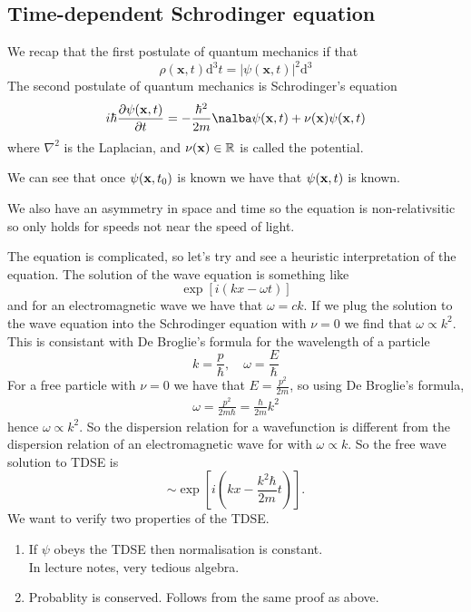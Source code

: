 \documentclass{article}
\begin{document}
\subsection{Time-dependent Schrodinger equation}
We recap that the first postulate of quantum mechanics if that 
\[
  \rho(\mathbf x,t)\mathrm d^3t=|\psi(\mathbf x,t)|^2\mathrm d^3
\]
The second postulate of quantum mechanics is Schrodinger's equation
\[
	i\hbar\frac{\partial\psi(\mathbf x,t)}{\partial t}=-\frac{\hbar^2}{2m}\nalba\psi(\mathbf x,t)+\nu(\mathbf x)\psi(\mathbf x,t)
\]
where $ \nabla^2 $ is the Laplacian, and $ \nu(\mathbf x)\in\mathbb{R} $ is called the potential.\par
We can see that once $ \psi(\mathbf{x},t_0) $ is known we have that $ \psi(\mathbf{x},t) $ is known.\par
We also have an asymmetry in space and time so the equation is non-relativsitic so only holds for speeds not near the speed of light.\par
The equation is complicated, so let's try and see a heuristic interpretation of the equation. The solution of the wave equation is something like
\[
	\exp[i(kx-\omega t)]
\]
and for an electromagnetic wave we have that $ \omega=ck $. If we plug the solution to the wave equation into the Schrodinger equation with $ \nu=0 $ we find that $ \omega\propto k^2 $. This is consistant with De Broglie's formula for the wavelength of a particle
\[
	k=\frac p\hbar,\quad \omega=\frac E\hbar
\]
For a free particle with $ \nu=0 $ we have that $ E=\frac{p^2}{2m} $, so using De Broglie's formula,
\begin{align*}
	\omega=\frac{p^2}{2m\hbar}=\frac{\hbar}{2m}k^2
\end{align*}
hence $ \omega\propto k^2 $. So the dispersion relation for a wavefunction is different from the dispersion relation of an electromagnetic wave for with $ \omega\propto k $. So the free wave solution to TDSE is
\[
	\sim \exp[i\left(kx-\frac{k^2\hbar}{2m}t\right)].
\]
We want to verify two properties of the TDSE.
\begin{enumerate}
	\item If $ \psi $ obeys the TDSE then normalisation is constant.\\
		\pf In lecture notes, very tedious algebra.
	\item Probablity is conserved.
		\pf Follows from the same proof as above.
\end{enumerate}
\end{document}

